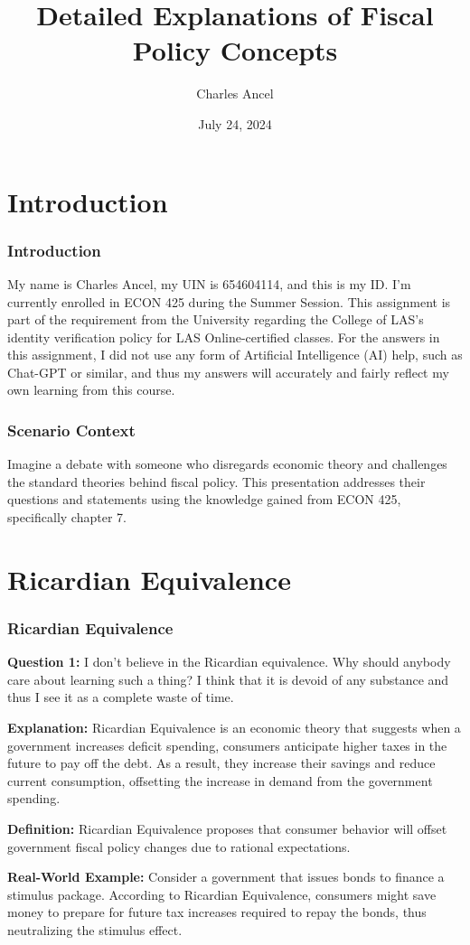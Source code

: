 \documentclass{beamer}
\title{Detailed Explanations of Fiscal Policy Concepts}
\author{Charles Ancel}
\date{July 24, 2024}
\begin{document}
\frame{\titlepage}

\section{Introduction}
\begin{frame}
    \frametitle{Introduction}
    My name is Charles Ancel, my UIN is 654604114, and this is my ID. I'm currently enrolled in ECON 425 during the Summer Session. This assignment is part of the requirement from the University regarding the College of LAS's identity verification policy for LAS Online-certified classes. For the answers in this assignment, I did not use any form of Artificial Intelligence (AI) help, such as Chat-GPT or similar, and thus my answers will accurately and fairly reflect my own learning from this course.
\end{frame}

\begin{frame}
    \frametitle{Scenario Context}
    Imagine a debate with someone who disregards economic theory and challenges the standard theories behind fiscal policy. This presentation addresses their questions and statements using the knowledge gained from ECON 425, specifically chapter 7.
\end{frame}

\section{Ricardian Equivalence}
\begin{frame}
    \frametitle{Ricardian Equivalence}
    \textbf{Question 1:} I don’t believe in the Ricardian equivalence. Why should anybody care about learning such a thing? I think that it is devoid of any substance and thus I see it as a complete waste of time.
    
    \textbf{Explanation:} Ricardian Equivalence is an economic theory that suggests when a government increases deficit spending, consumers anticipate higher taxes in the future to pay off the debt. As a result, they increase their savings and reduce current consumption, offsetting the increase in demand from the government spending.
    
    \textbf{Definition:} Ricardian Equivalence proposes that consumer behavior will offset government fiscal policy changes due to rational expectations.
    
    \textbf{Real-World Example:} Consider a government that issues bonds to finance a stimulus package. According to Ricardian Equivalence, consumers might save money to prepare for future tax increases required to repay the bonds, thus neutralizing the stimulus effect.
\end{frame}
\end{document}
